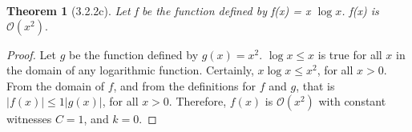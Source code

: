 \documentclass[a4paper, 12pt]{article}
\theoremstyle{plain}
\newtheorem*{theorem*}{Theorem}
\begin{document}
	
	\begin{theorem*}[3.2.2c]
		Let f be the function defined by f(x) = x $\log x$. \newline f(x) is $\mathcal{O}(x^{2}).$
	\end{theorem*}
	
	\begin{proof}
		Let $g$ be the function defined by $g(x) = x^{2}$. $\log x \le x$ is true for all $x$ in the domain of any logarithmic function. Certainly, $x \log x \le x^{2}$, for all $x > 0$. From the domain of $f$, and from the definitions for $f$ and $g$, that is $|f(x)| \le 1|g(x)|$, for all $x > 0$. Therefore, $f(x)$ is $\mathcal{O}(x^{2})$ with constant witnesses $C = 1$, and $k = 0$.
	\end{proof}
\end{document}

